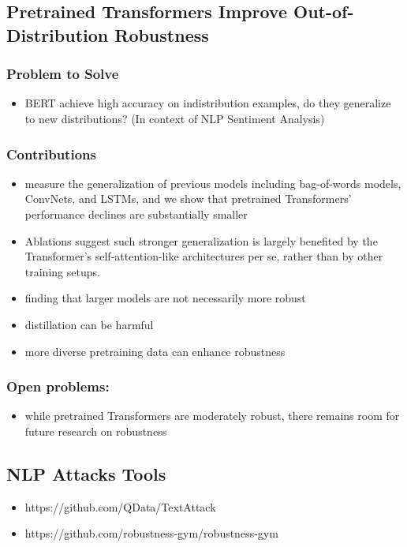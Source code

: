 \documentclass{article}
\begin{document}
\begin{flushleft}


 
 \subsection{Pretrained Transformers Improve Out-of-Distribution Robustness\cite{}} 
\subsubsection*{Problem to Solve}
\begin{itemize}
    \item BERT achieve high accuracy on indistribution examples, do they generalize to new distributions? (In context of NLP Sentiment Analysis)
\end{itemize}

\subsubsection*{Contributions}
\begin{itemize}
 \item measure the generalization of previous models including bag-of-words models, ConvNets, and LSTMs, and we show
that pretrained Transformers’ performance declines are substantially smaller 
\item Ablations suggest such stronger generalization is largely benefited by the Transformer’s self-attention-like architectures per se, rather than by other training setups.
 \item finding that larger models are not necessarily more robust
 \item distillation can be harmful
 \item more diverse pretraining data can enhance robustness
\end{itemize}

\subsubsection*{Open problems:}
\begin{itemize}
  \item while pretrained Transformers are moderately robust, there remains room for future research on robustness
\end{itemize}





\subsection*{NLP Attacks Tools}
\begin{itemize}
    \item https://github.com/QData/TextAttack
    \item https://github.com/robustness-gym/robustness-gym 
\end{itemize}


\newpage




\nocite{*}



\end{flushleft}
 
\end{document}

